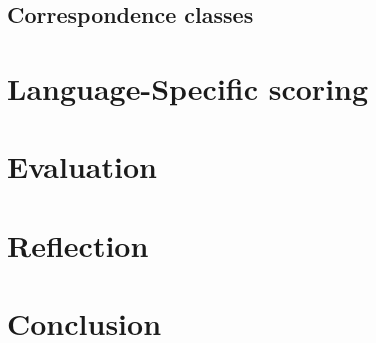 \documentclass[doc,natbib]{apa6}
\begin{document}
\subsection{Correspondence classes}

\section{Language-Specific scoring}


\section{Evaluation}

\section{Reflection}

\section{Conclusion}



\newpage
\begin{small} %
	\singlespacing %
	\thispagestyle{empty} %
\end{small} %
\end{document}
